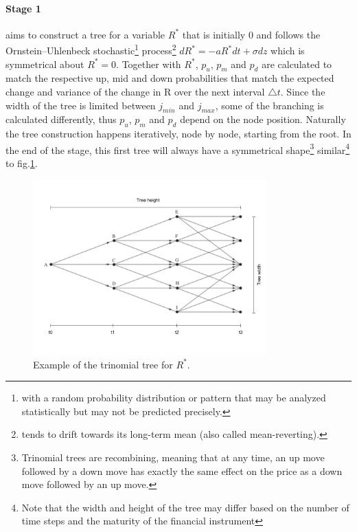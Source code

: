 \paragraph{Stage 1}
aims to construct a tree for a variable $R^*$ that is initially 0 and follows the Ornstein–Uhlenbeck stochastic\footnote{with a random probability distribution or pattern that may be analyzed statistically but may not be predicted precisely.} process\footnote{tends to drift towards its long-term mean (also called mean-reverting).} $dR^*=-aR^*dt + \sigma dz$ which is symmetrical about $R^*=0$\cite[pg.698-699]{ofod}. Together with $R^*$, $p_u$, $p_m$ and $p_d$ are calculated to match the respective up, mid and down probabilities that match the expected change and variance of the change in R over the next interval $\triangle t$. Since the width of the tree is limited between $j_{min}$ and $j_{max}$, some of the branching is calculated differently, thus $p_u$, $p_m$ and $p_d$ depend on the node position. Naturally the tree construction happens iteratively, node by node, starting from the root. In the end of the stage, this first tree will always have a symmetrical shape\footnote{Trinomial trees are recombining, meaning that at any time, an up move followed by a down move has exactly the same effect on the price as a down move followed by an up move.} similar\footnote{Note that the width and height of the tree may differ based on the number of time steps and the maturity of the financial instrument} to fig.\ref{fig:treeconststage1}. 
\begin{figure}[H]
	\centering
	\includegraphics[width=0.8\textwidth]{img/treeconststage1wh.jpg}
	\caption{Example of the trinomial tree for $R^*$.}
	\label{fig:treeconststage1}
\end{figure}

